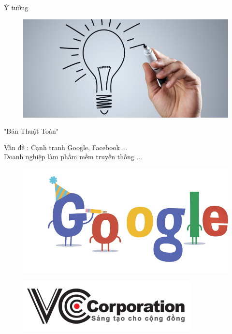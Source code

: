 \documentclass{beamer}
\begin{document}
\begin{frame}{Ý tưởng}
\begin{center}
\begin{figure}
\begin{center}
\includegraphics[scale=0.2]{2.jpg}
\end{center}

\end{figure}
\Large{"Bán Thuật Toán"} \\


\end{center} 
Vấn đề : Cạnh tranh Google,  Facebook ... \\ Doanh nghiệp làm phầm mềm truyền thống ...
\begin{figure}
\begin{center}
\includegraphics[scale=0.2]{4.jpg}
\end{center}

\end{figure}
\begin{figure}
\begin{center}
\includegraphics[scale=0.2]{6.png}
\end{center}

\end{figure}
\end{frame}
\end{document}
